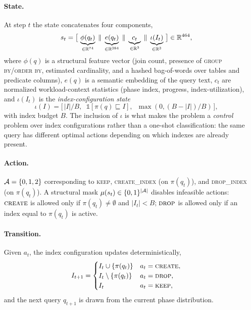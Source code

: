 \paragraph{State.}
At step \(t\) the state concatenates four components,
\begin{equation}
  s_t = \big[\,\underbrace{\phi(q_t)}_{\in\mathbb{R}^{74}} \;\|\;
   \underbrace{e(q_t)}_{\in\mathbb{R}^{384}} \;\|\;
   \underbrace{c_t}_{\in\mathbb{R}^{3}} \;\|\;
   \underbrace{\iota(I_t)}_{\in\mathbb{R}^{3}}\,\big] \in \mathbb{R}^{464},
  \label{eq:state}
\end{equation}
where \(\phi(q)\) is a structural feature vector (join count, presence of
\textsc{group by}/\textsc{order by}, estimated cardinality, and a hashed
bag-of-words over tables and predicate columns), \(e(q)\) is a semantic
embedding of the query text, \(c_t\) are normalized workload-context statistics
(phase index, progress, index-utilization), and \(\iota(I_t)\) is the
\emph{index-configuration state}
\begin{equation}
  \iota(I) = \big[\,|I|/B,\;\;
    \mathbb{1}[\pi(q)\sqsubseteq I],\;\;
    \max(0,(B-|I|)/B)\,\big],
  \label{eq:indexstate}
\end{equation}
with index budget \(B\). The inclusion of \(\iota\) is what makes the problem a
\emph{control} problem over index configurations rather than a one-shot
classification: the same query has different optimal actions depending on which
indexes are already present.

\paragraph{Action.}
\(\mathcal{A} = \{0,1,2\}\) corresponding to
\textsc{keep}, \textsc{create\_index} (on \(\pi(q_t)\)), and
\textsc{drop\_index} (on \(\pi(q_t)\)). A structural mask
\(\mu(s_t)\in\{0,1\}^{|\mathcal{A}|}\) disables infeasible actions:
\(\textsc{create}\) is allowed only if \(\pi(q_t)\neq\emptyset\) and
\(|I_t|<B\); \(\textsc{drop}\) is allowed only if an index equal to
\(\pi(q_t)\) is active.

\paragraph{Transition.}
Given \(a_t\), the index configuration updates deterministically,
\begin{equation}
  I_{t+1} =
  \begin{cases}
    I_t \cup \{\pi(q_t)\} & a_t=\textsc{create},\\
    I_t \setminus \{\pi(q_t)\} & a_t=\textsc{drop},\\
    I_t & a_t=\textsc{keep},
  \end{cases}
  \label{eq:transition}
\end{equation}
and the next query \(q_{t+1}\) is drawn from the current phase distribution.

